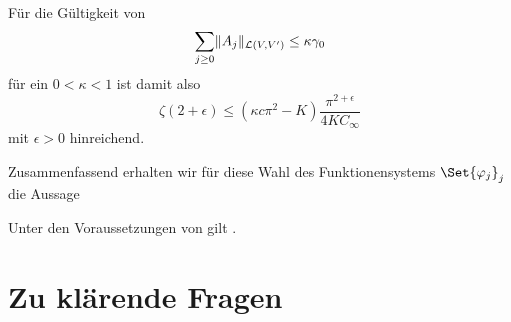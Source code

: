 \begin{Satz}
\begin{Beweis}
\begin{align}
        \end{align}
        Für die Gültigkeit von
        \begin{equation}
            \sum_{j \geq 0} \lVert A_{j}\rVert_{\mathcal L(V, V')} \leq \kappa \gamma_{0}
        \end{equation}
        für ein $0 < \kappa < 1$ ist damit also
        \begin{equation}
            \zeta(2 + \epsilon) \leq (\kappa c \pi^{2} - K) \frac{\pi^{2+\epsilon}}{4K  C_{\infty}}
        \end{equation}
        mit $\epsilon > 0$ hinreichend.
    \end{Beweis}
\end{Satz}

Zusammenfassend erhalten wir für diese Wahl des Funktionensystems $\Set{ \varphi_{j} }_{j}$ die Aussage

\begin{Korollar}
    Unter den Voraussetzungen von  gilt .
\end{Korollar}



\clearpage
\section{Zu klärende Fragen} %
\label{sub:zu_kl_rende_fragen}

